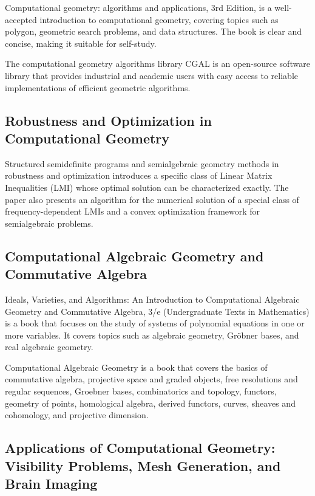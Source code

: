 \documentclass{article}
\begin{document}
\cite{Berg2000ComputationalGA} Computational geometry: algorithms and applications, 3rd Edition, is a well-accepted introduction to computational geometry, covering topics such as polygon, geometric search problems, and data structures. The book is clear and concise, making it suitable for self-study.

\cite{Fogel2015TheCG} The computational geometry algorithms library CGAL is an open-source software library that provides industrial and academic users with easy access to reliable implementations of efficient geometric algorithms.

\subsection{Robustness and Optimization in Computational Geometry}

\cite{Parrilo2000StructuredSP} Structured semidefinite programs and semialgebraic geometry methods in robustness and optimization introduces a specific class of Linear Matrix Inequalities (LMI) whose optimal solution can be characterized exactly. The paper also presents an algorithm for the numerical solution of a special class of frequency-dependent LMIs and a convex optimization framework for semialgebraic problems.

\subsection{Computational Algebraic Geometry and Commutative Algebra}

\cite{Cox2007IdealsVA} Ideals, Varieties, and Algorithms: An Introduction to Computational Algebraic Geometry and Commutative Algebra, 3/e (Undergraduate Texts in Mathematics) is a book that focuses on the study of systems of polynomial equations in one or more variables. It covers topics such as algebraic geometry, Gröbner bases, and real algebraic geometry.

\cite{Schenck2003ComputationalAG} Computational Algebraic Geometry is a book that covers the basics of commutative algebra, projective space and graded objects, free resolutions and regular sequences, Groebner bases, combinatorics and topology, functors, geometry of points, homological algebra, derived functors, curves, sheaves and cohomology, and projective dimension.

\subsection{Applications of Computational Geometry: Visibility Problems, Mesh Generation, and Brain Imaging}
\end{document}
